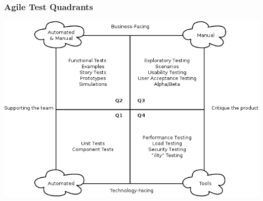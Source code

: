 \begin{frame}
    \frametitle{Agile Test Quadrants}
    \centering
    \includegraphics[scale=0.4]{agile_test_quadrants.png}
\end{frame}



